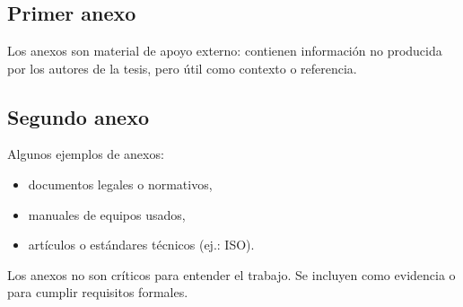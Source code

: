 \chapter*{\annexname}%

\section{Primer anexo}%
\label{anex:anexo1}%
Los anexos son material de apoyo externo: contienen información no producida por los autores de la tesis, pero útil como contexto o referencia.\par%

\section{Segundo anexo}%
\label{anex:anexo2}%
Algunos ejemplos de anexos:%
\begin{itemize}
	\item documentos legales o normativos,%
	\item manuales de equipos usados,%
	\item artículos o estándares técnicos (ej.: ISO).%
\end{itemize}%

Los anexos no son críticos para entender el trabajo. Se incluyen como evidencia o para cumplir requisitos formales.\par%